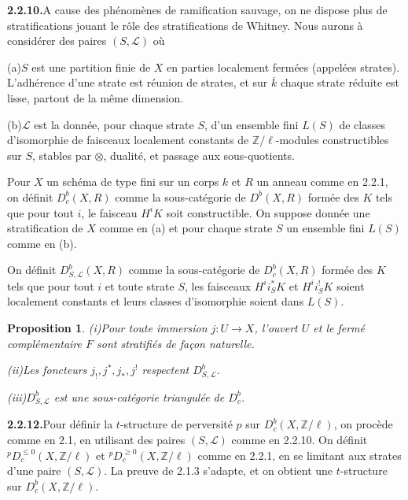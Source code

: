 \documentclass[12pt,a4paper]{article}
\theoremstyle{plain}
\newtheorem{proposition}[theorem]{Proposition}
\theoremstyle{definition}
\begin{document}
\smallskip
\noindent\textbf{2.2.10.}\quad A cause des ph\'enom\`enes de ramification sauvage, on ne dispose plus de stratifications jouant le r\^ole des stratifications de Whitney. Nous aurons \`a consid\'erer des paires $(S, \mathcal{L})$ o\`u

(a)\quad $S$ est une partition finie de $X$ en parties localement ferm\'ees (appel\'ees strates). L'adh\'erence d'une strate est r\'eunion de strates, et sur $\overline{k}$ chaque strate r\'eduite est lisse, partout de la m\^eme dimension.

(b)\quad $\mathcal{L}$ est la donn\'ee, pour chaque strate $S$, d'un ensemble fini $L(S)$ de classes d'isomorphie de faisceaux localement constants de $\mathbb{Z}/\ell$-modules constructibles sur $S$, stables par $\otimes$, dualit\'e, et passage aux sous-quotients.

Pour $X$ un sch\'ema de type fini sur un corps $k$ et $R$ un anneau comme en 2.2.1, on d\'efinit $D_c^b(X, R)$ comme la sous-cat\'egorie de $D^b(X, R)$ form\'ee des $K$ tels que pour tout $i$, le faisceau $H^i K$ soit constructible. On suppose donn\'ee une stratification de $X$ comme en (a) et pour chaque strate $S$ un ensemble fini $L(S)$ comme en (b).

On d\'efinit $D_{S, \mathcal{L}}^b(X, R)$ comme la sous-cat\'egorie de $D_c^b(X, R)$ form\'ee des $K$ tels que pour tout $i$ et toute strate $S$, les faisceaux $H^i i_S^* K$ et $H^i i_S^! K$ soient localement constants et leurs classes d'isomorphie soient dans $L(S)$.

\begin{proposition}\label{prop:2.2.11}
\emph{(i)}\quad Pour toute immersion $j : U \to X$, l'ouvert $U$ et le ferm\'e compl\'ementaire $F$ sont stratifi\'es de fa\c{c}on naturelle.

\emph{(ii)}\quad Les foncteurs $j_!, j^*, j_*, j^!$ respectent $D_{S, \mathcal{L}}^b$.

\emph{(iii)}\quad $D_{S, \mathcal{L}}^b$ est une sous-cat\'egorie triangul\'ee de $D_c^b$.
\end{proposition}

\smallskip
\noindent\textbf{2.2.12.}\quad Pour d\'efinir la $t$-structure de perversit\'e $p$ sur $D_c^b(X, \mathbb{Z}/\ell)$, on proc\`ede comme en 2.1, en utilisant des paires $(S, \mathcal{L})$ comme en 2.2.10. On d\'efinit ${}^p D_c^{\leqslant 0}(X, \mathbb{Z}/\ell)$ et ${}^p D_c^{\geqslant 0}(X, \mathbb{Z}/\ell)$ comme en 2.2.1, en se limitant aux strates d'une paire $(S, \mathcal{L})$. La preuve de 2.1.3 s'adapte, et on obtient une $t$-structure sur $D_c^b(X, \mathbb{Z}/\ell)$.
\end{document}
